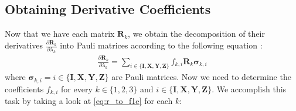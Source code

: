 \documentclass{aux/ttuthes2007}
\newcommand{\fpd}[2]{\frac{\partial #1}{\partial #2}}
\begin{document}
\subsection {\textbf{Obtaining Derivative Coefficients}}
%
Now that we have each matrix $\bm R_k$, we obtain the decomposition of their derivatives $\fpd{\bm R_k}{\lambda_k}$ into Pauli matrices according to the following equation \cite{benjamin}:
%
\begin{equation}\label{eq:r_to_f1e}
\begin{split}
	\fpd{\bm R_k}{\lambda_k} = \sum_{i \in \{\bm I, \bm X, \bm Y, \bm Z\}} f_{k, i} \bm R_k \bm \sigma_{k, i}
\end{split}
\end{equation}
%
where $\bm \sigma_{k, i} = i \in \{\bm I, \bm X, \bm Y, \bm Z\}$ are Pauli matrices.
Now we need to determine the coefficients $f_{k, i}$ for every $k \in \{1, 2, 3\}$ and $i \in \{\bm I, \bm X, \bm Y, \bm Z\}$. We accomplish this task by taking a look at \ref{eq:r_to_f1e} for each $k$:
%
\end{document}
